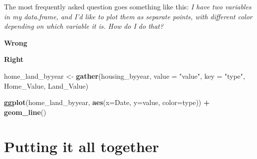 \documentclass[]{book}
\newenvironment{Shaded}{\begin{snugshade}}{\end{snugshade}}
\newcommand{\KeywordTok}[1]{\textcolor[rgb]{0.13,0.29,0.53}{\textbf{#1}}}
\newcommand{\DataTypeTok}[1]{\textcolor[rgb]{0.13,0.29,0.53}{#1}}
\newcommand{\StringTok}[1]{\textcolor[rgb]{0.31,0.60,0.02}{#1}}
\newcommand{\OperatorTok}[1]{\textcolor[rgb]{0.81,0.36,0.00}{\textbf{#1}}}
\newcommand{\NormalTok}[1]{#1}
\begin{document}
The most frequently asked question goes something like this: \emph{I
have two variables in my data.frame, and I'd like to plot them as
separate points, with different color depending on which variable it is.
How do I do that?}

\textbf{Wrong}

\begin{Shaded}
\end{Shaded}

\textbf{Right}

\begin{Shaded}
\begin{Highlighting}[]
\NormalTok{home_land_byyear <-}\StringTok{ }\KeywordTok{gather}\NormalTok{(housing_byyear,}
                           \DataTypeTok{value =} \StringTok{"value"}\NormalTok{,}
                           \DataTypeTok{key =} \StringTok{"type"}\NormalTok{,}
\NormalTok{                           Home_Value, Land_Value)}

\KeywordTok{ggplot}\NormalTok{(home_land_byyear, }\KeywordTok{aes}\NormalTok{(}\DataTypeTok{x=}\NormalTok{Date, }\DataTypeTok{y=}\NormalTok{value, }\DataTypeTok{color=}\NormalTok{type)) }\OperatorTok{+}
\StringTok{  }\KeywordTok{geom_line}\NormalTok{()}
\end{Highlighting}
\end{Shaded}

\section{Putting it all together}\label{putting-it-all-together}
\end{document}
